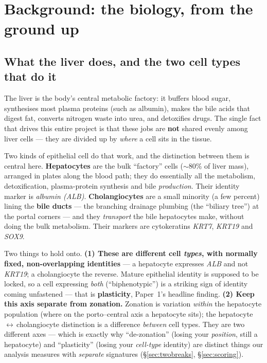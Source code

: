 \documentclass[11pt]{article}
\newcommand{\gene}[1]{\textit{#1}}
\begin{document}
\section{Background: the biology, from the ground up}

\subsection{What the liver does, and the two cell types that do it}
\label{sec:liver}

The liver is the body's central metabolic factory: it buffers blood sugar, synthesises most plasma
proteins (such as albumin), makes the bile acids that digest fat, converts nitrogen waste into urea,
and detoxifies drugs. The single fact that drives this entire project is that these jobs are
\textbf{not} shared evenly among liver cells --- they are divided up by \emph{where} a cell sits in the
tissue.

Two kinds of epithelial cell do that work, and the distinction between them is central here.
\textbf{Hepatocytes} are the bulk ``factory'' cells ($\sim$80\% of liver mass), arranged in plates
along the blood path; they do essentially all the metabolism, detoxification, plasma-protein synthesis
and bile \emph{production}. Their identity marker is \gene{albumin (ALB)}. \textbf{Cholangiocytes} are
a small minority (a few percent) lining the \textbf{bile ducts} --- the branching drainage plumbing
(the ``biliary tree'') at the portal corners --- and they \emph{transport} the bile hepatocytes make,
without doing the bulk metabolism. Their markers are cytokeratins \gene{KRT7}, \gene{KRT19} and
\gene{SOX9}.

Two things to hold onto. \textbf{(1) These are different cell \emph{types}, with normally fixed,
non-overlapping identities} --- a hepatocyte expresses \gene{ALB} and not \gene{KRT19}; a
cholangiocyte the reverse. Mature epithelial identity is supposed to be locked, so a cell expressing
\emph{both} (``biphenotypic'') is a striking sign of identity coming unfastened --- that is
\textbf{plasticity}, Paper~1's headline finding. \textbf{(2) Keep this axis separate from zonation.}
Zonation is variation \emph{within} the hepatocyte population (where on the porto--central axis a
hepatocyte sits); the hepatocyte\,$\leftrightarrow$\,cholangiocyte distinction is a difference
\emph{between} cell types. They are two different axes --- which is exactly why ``de-zonation''
(losing your \emph{position}, still a hepatocyte) and ``plasticity'' (losing your \emph{cell-type}
identity) are distinct things our analysis measures with \emph{separate} signatures
(\S\ref{sec:twobreaks}, \S\ref{sec:scoring}).
\end{document}
